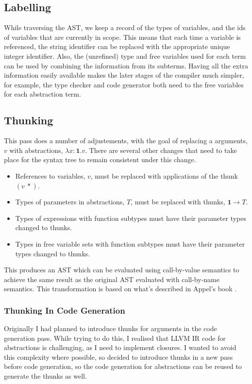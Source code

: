 \subsection{Labelling}

While traversing the AST, we keep a record of the types of variables, and the ids of variables that are currently
in scope.
This means that each time a variable is referenced, the string identifier can be replaced with the appropriate
unique integer identifier.
Also, the (unrefined) type and free variables used for each term can be used by combining
the information from its subterms.
Having all the extra information easily available makes the later stages of the compiler much simpler,
for example, the type checker and code generator both need to the free variables for each abstraction term.

\subsection{Thunking}

This pass does a number of adjustements, with the goal of replacing a arguments, $v$ with abstractions,
$\lambda x: \textbf{1} . v$.
There are several other changes that need to take place for the syntax tree to remain consistent under this
change.
\begin{itemize}
    \item References to variables, $v$, must be replaced with applications of the thunk $(v\ \ast)$.
    \item Types of parameters in abstractions, $T$, must be replaced with thunks, $\textbf{1} \rightarrow T$.
    \item Types of expressions with function subtypes must have their parameter types changed to thunks.
    \item Types in free variable sets with function subtypes must have their parameter types changed to thunks.
\end{itemize}
This produces an AST which can be evaluated using call-by-value semantics to achieve the same result as
the original AST evaluated with call-by-name semantics.
This transformation is based on what's described in Appel's book \cite{appel1998}.

\subsubsection{Thunking In Code Generation}

Originally I had planned to introduce thunks for arguments in the code generation pass.
While trying to do this, I realised that LLVM IR code for abstractions is challenging, as I need to
implement closures.
I wanted to avoid this complexity where possible, so decided to introduce thunks in a new pass before
code generation, so the code generation for abstractions can be reused to generate the thunks as well.

